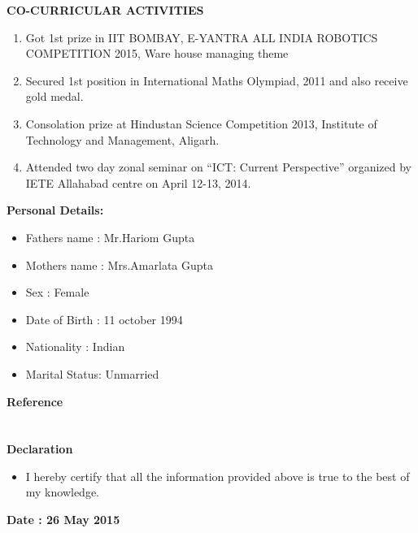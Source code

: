 \documentclass[10pt]{article}
\begin{document}
		\textbf{CO-CURRICULAR ACTIVITIES}\\
		\begin{enumerate}
	\item 	Got 1st prize in IIT BOMBAY, E-YANTRA ALL INDIA ROBOTICS COMPETITION 2015,
	Ware house managing theme 
	\item 	Secured 1st position in International Maths Olympiad, 2011 and also receive gold medal.
	\item 	Consolation prize at Hindustan Science Competition 2013, Institute of Technology and Management, Aligarh.
	\item 	Attended two day zonal seminar on “ICT: Current Perspective” organized by IETE Allahabad centre on April 12-13, 2014.
	
		\end{enumerate}
		\textbf{Personal Details:}\\
		\begin{itemize}
			\item Fathers name : Mr.Hariom Gupta
			\item Mothers name : Mrs.Amarlata Gupta
			\item Sex          : Female
			\item Date of Birth : 11 october 1994
			\item Nationality : Indian
			\item Marital Status: Unmarried
	    \end{itemize}
	    \textbf{Reference}\\ \\ \\
	    \textbf{Declaration}\\ 
	    \begin{itemize}
	    \item  I hereby certify that all the information provided above is true to the best of my knowledge.
	\end{itemize}
	    \textbf{Date : 26 May 2015} 
	
\end{document}
